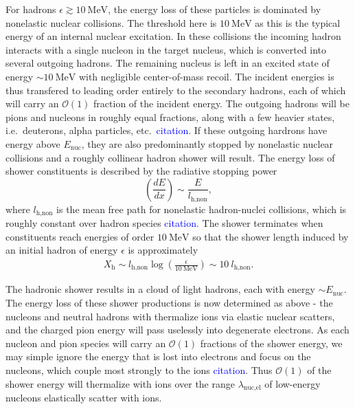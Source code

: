 \documentclass[twocolumn,showpacs,preprintnumbers,amsmath,amssymb,prd]{revtex4}
\newcommand{\OO}{\mathcal{O}}
\newcommand{\MeV}{\text{MeV}}
\def\r{\right)}
\def\l{\left(}
\begin{document}
For hadrons $\epsilon \gtrsim 10~\text{MeV}$, the energy loss of these particles is dominated by nonelastic nuclear collisions.
The threshold here is $10~\MeV$ as this is the typical energy of an internal nuclear excitation.  
In these collisions the incoming hadron interacts with a single nucleon in the target nucleus, which is converted into several outgoing hadrons.
The remaining nucleus is left in an excited state of energy $\sim 10~\MeV$ with negligible center-of-mass recoil. 
The incident energies is thus transfered to leading order entirely to the secondary hadrons, each of which will carry an $\OO(1)$ fraction of the incident energy.
The outgoing hadrons will be pions and nucleons in roughly equal fractions, along with a few heavier states, i.e.\ deuterons, alpha particles, etc.\ \textcolor{blue}{citation}. 
If these outgoing hardrons have energy above $E_\text{nuc}$, they are also predominantly stopped by nonelastic nuclear collisions and a roughly collinear hadron shower will result. 
The energy loss of shower constituents is described by the radiative stopping power
\begin{equation}
  \l \frac{dE}{dx} \r \sim \frac{E}{l_\text{h,non}},
\end{equation}
where $l_\text{h,non}$ is the mean free path for nonelastic hadron-nuclei collisions, which is roughly constant over hadron species \textcolor{blue}{citation}.
The shower terminates when constituents reach energies of order $10~\MeV$ so that the shower length induced by an initial hadron of energy $\epsilon$ is approximately 
\begin{align}
\label{eq:hadlength}
  X_\text{h} \sim l_\text{h,non} \log\l\frac{\epsilon}{10~\MeV}\r 
  \sim 10 ~l_\text{h,non}. 
\end{align}

The hadronic shower results in a cloud of light hadrons, each with energy $\sim E_\text{nuc}$. 
The energy loss of these shower productions is now determined as above - the nucleons and neutral hadrons with thermalize ions via elastic nuclear scatters, and the charged pion energy will pass uselessly into degenerate electrons. 
As each nucleon and pion species will carry an $\OO(1)$ fractions of the shower energy, we may simple ignore the energy that is lost into electrons and focus on the nucleons, which couple most strongly to the ions \textcolor{blue}{citation}. 
Thus $\OO(1)$ of the shower energy will thermalize with ions over the range $\lambda_\text{nuc,el}$ of low-energy nucleons elastically scatter with ions. 
\end{document}
